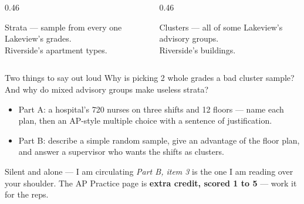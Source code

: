 \documentclass[aspectratio=169, 11pt]{beamer}
\begin{document}
\begin{frame}[t, plain]
  \vspace{6pt}
  \begin{columns}[t]
    \begin{column}{0.46\textwidth}
      \begin{block}{Strata --- sample from every one}
        Lakeview's grades.\\
        Riverside's apartment types.
      \end{block}
    \end{column}
    \begin{column}{0.46\textwidth}
      \begin{block}{Clusters --- all of some}
        Lakeview's advisory groups.\\
        Riverside's buildings.
      \end{block}
    \end{column}
  \end{columns}
  \vspace{12pt}
  \begin{block}{Two things to say out loud}
    Why is picking 2 whole grades a bad cluster sample? And why do mixed advisory groups make
    useless strata?
  \end{block}
\end{frame}

\begin{frame}[t, plain]
  \begin{itemize}\setlength{\itemsep}{5pt}
    \item Part A: a hospital's 720 nurses on three shifts and 12 floors --- name each plan, then
          an AP-style multiple choice with a sentence of justification.
    \item Part B: describe a simple random sample, give an advantage of the floor plan, and
          answer a supervisor who wants the shifts as clusters.
  \end{itemize}
  \begin{block}{Silent and alone --- I am circulating}
    \emph{Part B, item 3} is the one I am reading over your shoulder. The AP Practice page is
    \textbf{extra credit, scored 1 to 5} --- work it for the reps.
  \end{block}
\end{frame}
\end{document}
